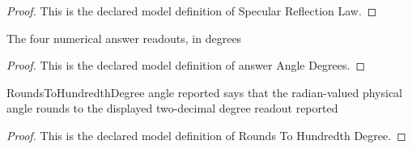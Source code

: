 \begin{proof}
  This is the declared model definition of Specular Reflection Law.
\end{proof}
\begin{definition}
  \label{def:physics:phyx-mini-0017:phyxminiproblems-problem0017-answerangledegrees}
  The four numerical answer readouts, in degrees
\end{definition}
\begin{proof}
  This is the declared model definition of answer Angle Degrees.
\end{proof}
\begin{definition}
  \label{def:physics:phyx-mini-0017:phyxminiproblems-problem0017-roundstohundredthdegree}
  RoundsToHundredthDegree angle reported says that the radian-valued physical angle rounds to the displayed two-decimal degree readout reported
\end{definition}
\begin{proof}
  This is the declared model definition of Rounds To Hundredth Degree.
\end{proof}

